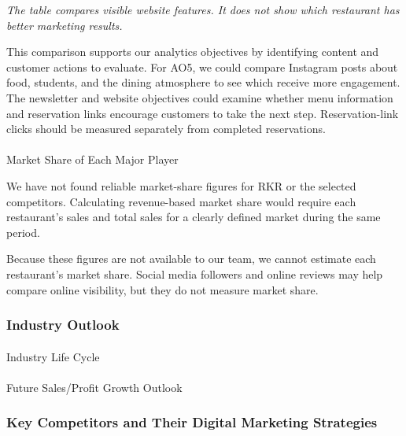 \documentclass[
  12pt,
  letterpaper,
  DIV=11,
  numbers=noendperiod]{scrartcl}
\makeatletter
\let\oldparagraph\paragraph
\renewcommand{\paragraph}{
    \@ifstar
      \xxxParagraphStar
      \xxxParagraphNoStar
  }
\newcommand{\xxxParagraphStar}[1]{\oldparagraph*{#1}\mbox{}}
\newcommand{\xxxParagraphNoStar}[1]{\oldparagraph{#1}\mbox{}}
\makeatother
\begin{document}
\emph{The table compares visible website features. It does not show
which restaurant has better marketing results.}

This comparison supports our analytics objectives by identifying content
and customer actions to evaluate. For AO5, we could compare Instagram
posts about food, students, and the dining atmosphere to see which
receive more engagement. The newsletter and website objectives could
examine whether menu information and reservation links encourage
customers to take the next step. Reservation-link clicks should be
measured separately from completed reservations.

\paragraph{Market Share of Each Major
Player}\label{market-share-of-each-major-player}

We have not found reliable market-share figures for RKR or the selected
competitors. Calculating revenue-based market share would require each
restaurant's sales and total sales for a clearly defined market during
the same period.

Because these figures are not available to our team, we cannot estimate
each restaurant's market share. Social media followers and online
reviews may help compare online visibility, but they do not measure
market share.

\subsubsection{Industry Outlook}\label{industry-outlook}

\paragraph{Industry Life Cycle}\label{industry-life-cycle}

\paragraph{Future Sales/Profit Growth
Outlook}\label{future-salesprofit-growth-outlook}

\subsubsection{Key Competitors and Their Digital Marketing
Strategies}\label{key-competitors-and-their-digital-marketing-strategies}
\end{document}
